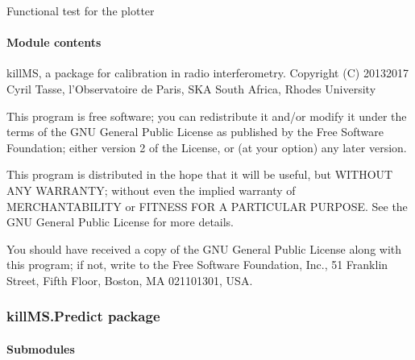 \documentclass[letterpaper,10pt,english]{sphinxmanual}
\begin{document}
\begin{fulllineitems}
\label{\detokenize{api/killMS.Plot:killMS.Plot.Graph.test}}
\pysigstartsignatures
{}
\pysigstopsignatures
\sphinxAtStartPar
Functional test for the plotter

\end{fulllineitems}



\paragraph{Module contents}
\label{\detokenize{api/killMS.Plot:module-killMS.Plot}}\label{\detokenize{api/killMS.Plot:module-contents}}
\sphinxAtStartPar
killMS, a package for calibration in radio interferometry.
Copyright (C) 2013\sphinxhyphen{}2017  Cyril Tasse, l’Observatoire de Paris,
SKA South Africa, Rhodes University

\sphinxAtStartPar
This program is free software; you can redistribute it and/or
modify it under the terms of the GNU General Public License
as published by the Free Software Foundation; either version 2
of the License, or (at your option) any later version.

\sphinxAtStartPar
This program is distributed in the hope that it will be useful,
but WITHOUT ANY WARRANTY; without even the implied warranty of
MERCHANTABILITY or FITNESS FOR A PARTICULAR PURPOSE.  See the
GNU General Public License for more details.

\sphinxAtStartPar
You should have received a copy of the GNU General Public License
along with this program; if not, write to the Free Software
Foundation, Inc., 51 Franklin Street, Fifth Floor, Boston, MA  02110\sphinxhyphen{}1301, USA.

\sphinxstepscope


\subsubsection{killMS.Predict package}
\label{\detokenize{api/killMS.Predict:killms-predict-package}}\label{\detokenize{api/killMS.Predict::doc}}

\paragraph{Submodules}
\label{\detokenize{api/killMS.Predict:submodules}}
\end{document}
